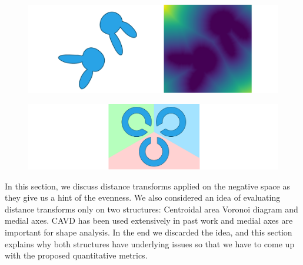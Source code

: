 \begin{figure}[ht]
\centering
\includegraphics[width=1.0\textwidth]{figures/metrics/rabbit.pdf}
\caption[An example of distance transform of negative space]
{\label{fig_distance_transform}
  }
\end{figure}

\begin{figure}[t]
\centering
\includegraphics[width=1.0\textwidth]{figures/metrics/cs.pdf}
\caption[A Voronoi diagram of three ``C'' shapes]
{\label{fig_cs}
  }
\end{figure}

\newtext
{
In this section, we discuss distance transforms applied on the negative space as they give us a hint of the evenness.
We also considered an idea of evaluating distance transforms only on two structures: Centroidal area Voronoi diagram and medial axes.
CAVD has been used extensively in past work and medial axes are important for shape analysis.
In the end we discarded the idea, and this section explains why both structures have underlying issues 
so that we have to come up with the proposed quantitative metrics.
}

